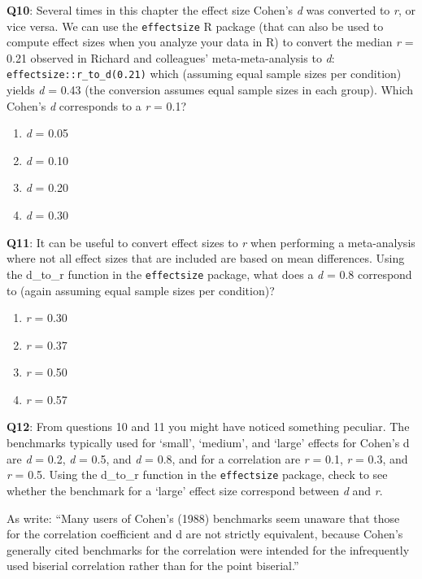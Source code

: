 \documentclass[
  oneside]{krantz}
\providecommand{\tightlist}{%
  \setlength{\itemsep}{0pt}\setlength{\parskip}{0pt}}
\begin{document}
\textbf{Q10}: Several times in this chapter the effect size Cohen's \emph{d} was converted to \emph{r}, or vice versa. We can use the \texttt{effectsize} R package (that can also be used to compute effect sizes when you analyze your data in R) to convert the median \emph{r} = 0.21 observed in Richard and colleagues' meta-meta-analysis to \emph{d}: \texttt{effectsize::r\_to\_d(0.21)} which (assuming equal sample sizes per condition) yields \emph{d} = 0.43 (the conversion assumes equal sample sizes in each group). Which Cohen's \emph{d} corresponds to a \emph{r} = 0.1?

\begin{enumerate}
\def\labelenumi{\Alph{enumi})}
\tightlist
\item
  \emph{d} = 0.05
\item
  \emph{d} = 0.10
\item
  \emph{d} = 0.20
\item
  \emph{d} = 0.30
\end{enumerate}

\textbf{Q11}: It can be useful to convert effect sizes to \emph{r} when performing a meta-analysis where not all effect sizes that are included are based on mean differences. Using the d\_to\_r function in the \texttt{effectsize} package, what does a \emph{d} = 0.8 correspond to (again assuming equal sample sizes per condition)?

\begin{enumerate}
\def\labelenumi{\Alph{enumi})}
\tightlist
\item
  \emph{r} = 0.30
\item
  \emph{r} = 0.37
\item
  \emph{r} = 0.50
\item
  \emph{r} = 0.57
\end{enumerate}

\textbf{Q12}: From questions 10 and 11 you might have noticed something peculiar. The benchmarks typically used for `small', `medium', and `large' effects for Cohen's d are \emph{d} = 0.2, \emph{d} = 0.5, and \emph{d} = 0.8, and for a correlation are \emph{r} = 0.1, \emph{r} = 0.3, and \emph{r} = 0.5. Using the d\_to\_r function in the \texttt{effectsize} package, check to see whether the benchmark for a `large' effect size correspond between \emph{d} and \emph{r}.

As \citet{mcgrath_when_2006} write: ``Many users of Cohen's (1988) benchmarks seem unaware that those for the correlation coefficient and d are not strictly equivalent, because Cohen's generally cited benchmarks for the correlation were intended for the infrequently used biserial correlation rather than for the point biserial.''
\end{document}
